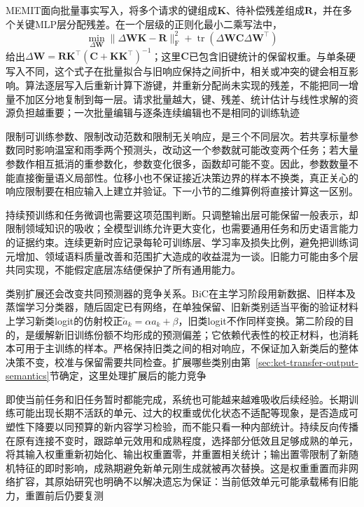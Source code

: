 MEMIT面向批量事实写入，将多个请求的键组成$\bm K$、待补偿残差组成$\bm R$，并在多个关键MLP层分配残差。在一个层级的正则化最小二乘写法中，
\[
\min_{\Delta\bm W}
\lVert\Delta\bm W\bm K-\bm R\rVert_{\mathrm F}^2
+\operatorname{tr}(\Delta\bm W\bm C\Delta\bm W^\top)
\]
给出$\Delta\bm W=\bm R\bm K^\top
(\bm C+\bm K\bm K^\top)^{-1}$；这里$\bm C$已包含旧键统计的保留权重。与单条硬写入不同，这个式子在批量拟合与旧响应保持之间折中，相关或冲突的键会相互影响。算法逐层写入后重新计算下游键，并重新分配尚未实现的残差，不能把同一增量不加区分地复制到每一层。请求批量越大，键、残差、统计估计与线性求解的资源负担越重要；一次批量编辑与逐条连续编辑也不是相同的训练轨迹

限制可训练参数、限制改动范数和限制无关响应，是三个不同层次。若共享标量参数同时影响温室和雨季两个预测头，改动这一个参数就可能改变两个任务；若大量参数作相互抵消的重参数化，参数变化很多，函数却可能不变。因此，参数数量不能直接衡量语义局部性。位移小也不保证接近决策边界的样本不换类，真正关心的响应限制要在相应输入上建立并验证。下一小节的二维算例将直接计算这一区别。

持续预训练和任务微调也需要这项范围判断。只调整输出层可能保留一般表示，却限制领域知识的吸收；全模型训练允许更大变化，也需要通用任务和历史语言能力的证据约束。连续更新时应记录每轮可训练层、学习率及损失比例，避免把训练词元增加、领域语料质量改善和范围扩大造成的收益混为一谈。旧能力可能由多个层共同实现，不能假定底层冻结便保护了所有通用能力。

类别扩展还会改变共同预测器的竞争关系。BiC在主学习阶段用新数据、旧样本及蒸馏学习分类器，随后固定已有网络，在单独保留、旧新类别适当平衡的验证材料上学习新类logit的仿射校正$\tilde a_k=\alpha a_k+\beta$，旧类logit不作同样变换。第二阶段的目的，是缓解新旧训练份额不均形成的预测偏差；它依赖代表性的校正材料，也消耗本可用于主训练的样本。严格保持旧类之间的相对响应，不保证加入新类后的整体决策不变，校准与保留需要共同检查。扩展哪些类别由第~\ref{sec:ket-transfer-output-semantics}节确定，这里处理扩展后的能力竞争

即使当前任务和旧任务暂时都能完成，系统也可能越来越难吸收后续经验。长期训练可能出现长期不活跃的单元、过大的权重或优化状态不适配等现象，是否造成可塑性下降要以同预算的新内容学习检验，而不能只看一种内部统计。持续反向传播在原有连接不变时，跟踪单元效用和成熟程度，选择部分低效且足够成熟的单元，将其输入权重重新初始化、输出权重置零，并重置相关统计；输出置零限制了新随机特征的即时影响，成熟期避免新单元刚生成就被再次替换。这是权重重置而非网络扩容，其原始研究也明确不以解决遗忘为保证：当前低效单元可能承载稀有旧能力，重置前后仍要复测


